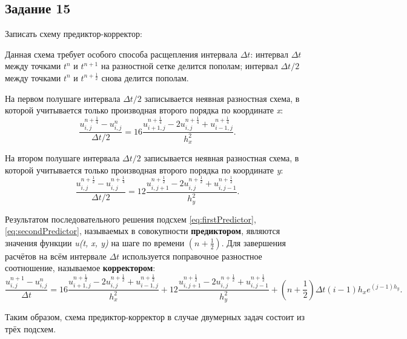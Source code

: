 \documentclass[12pt, a4paper]{report}
\begin{document}
	\subsection*{Задание 15}
	\large
	Записать схему предиктор-корректор: \par
	Данная схема требует особого способа расщепления интервала $\Delta t$: интервал $\Delta t$ между точками $t^{n}$ и $t^{n+1}$ на разностной сетке делится пополам; интервал $\Delta t/2$ между точками $t^{n}$ и $t^{n+\frac{1}{2}}$ снова делится пополам. \par
	На первом полушаге интервала $\Delta t/2$ записывается неявная разностная схема, в которой учитывается только производная второго порядка по координате \textit{x}:
	\begin{equation}\label{eq:firstPredictor}
		\frac{u_{i, j}^{n+\frac{1}{4}} - u_{i, j}^{n}}{\Delta t/2} = 16\frac{u_{i+1, j}^{n+\frac{1}{4}} - 2u_{i, j}^{n+\frac{1}{4}} + u_{i-1, j}^{n+\frac{1}{4}}}{h_{x}^{2}}.
	\end{equation}
	\par
	На втором полушаге интервала $\Delta t/2$ записывается неявная разностная схема, в которой учитывается только производная второго порядка по координате \textit{y}:
	\begin{equation}\label{eq:secondPredictor}
		\frac{u_{i, j}^{n+\frac{1}{2}} - u_{i, j}^{n+\frac{1}{4}}}{\Delta t/2} = 12\frac{u_{i, j+1}^{n+\frac{1}{2}} - 2u_{i, j}^{n+\frac{1}{2}} + u_{i, j-1}^{n+\frac{1}{2}}}{h_{y}^{2}}.
	\end{equation}
	\par
	Результатом последовательного решения подсхем \eqref{eq:firstPredictor}, \eqref{eq:secondPredictor}, называемых в совокупности \textbf{предиктором}, являются значения функции \textit{u(t, x, y)} на шаге по времени $(n+\frac{1}{2})$. Для завершения расчётов на всём интервале $\Delta t$ используется поправочное разностное соотношение, называемое \textbf{корректором}:
	\small
	\begin{equation}\label{eq:corrector}
		\frac{u_{i, j}^{n+1} - u_{i, j}^{n}}{\Delta t} = 16\frac{u_{i+1, j}^{n+\frac{1}{2}} - 2u_{i, j}^{n+\frac{1}{2}} + u_{i-1, j}^{n+\frac{1}{2}}}{h_{x}^{2}} + 12\frac{u_{i, j+1}^{n+\frac{1}{2}} - 2u_{i, j}^{n+\frac{1}{2}} + u_{i, j-1}^{n+\frac{1}{2}}}{h_{y}^{2}} + (n+\frac{1}{2})\Delta t(i-1)h_{x}e^{(j-1)h_{y}}.
	\end{equation}
	\par
	Таким образом, схема предиктор-корректор в случае двумерных задач состоит из трёх подсхем.
\end{document}
